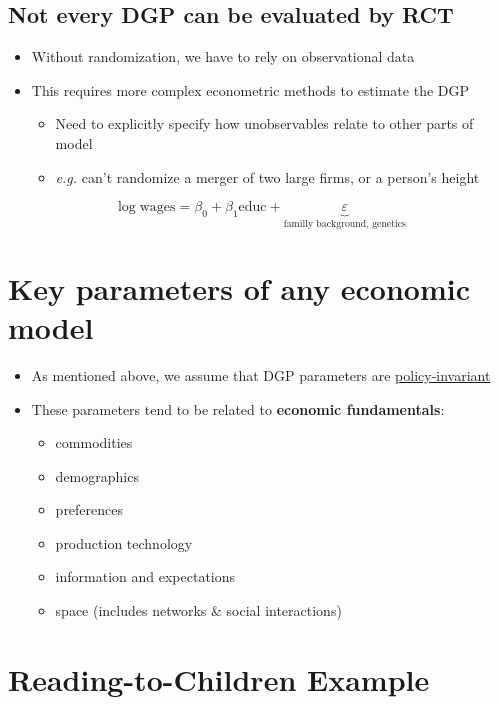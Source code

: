 \documentclass[11pt]{article}
\begin{document}
\subsection{Not every DGP can be evaluated by RCT}
\label{sec:orgc055deb}

\begin{itemize}
\item Without randomization, we have to rely on observational data
\item This requires more complex econometric methods to estimate the DGP
\begin{itemize}
\item Need to explicitly specify how unobservables relate to other parts of model
\item \emph{e.g.} can't randomize a merger of two large firms, or a person's height
\end{itemize}
\end{itemize}

$$
\log \text{wages} = \beta_0 + \beta_1 \text{educ} + \underbrace{\varepsilon}_{\text{familly background, genetics}}
$$

\section{Key parameters of any economic model}
\label{sec:orgf0c891f}

\begin{itemize}
\item As mentioned above, we assume that DGP parameters are \uline{policy-invariant}
\item These parameters tend to be related to \textbf{economic fundamentals}:

\begin{itemize}
\item commodities
\item demographics
\item preferences
\item production technology
\item information and expectations
\item space (includes networks \& social interactions)
\end{itemize}
\end{itemize}

\section{Reading-to-Children Example}
\label{sec:orgd927c46}
\end{document}
